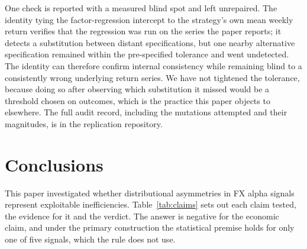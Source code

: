 \documentclass[11pt]{article}
\begin{document}
One check is reported with a measured blind spot and left unrepaired. The identity tying the factor-regression intercept to the strategy's own mean weekly return verifies that the regression was run on the series the paper reports; it detects a substitution between distant specifications, but one nearby alternative specification remained within the pre-specified tolerance and went undetected. The identity can therefore confirm internal consistency while remaining blind to a consistently wrong underlying return series. We have not tightened the tolerance, because doing so after observing which substitution it missed would be a threshold chosen on outcomes, which is the practice this paper objects to elsewhere. The full audit record, including the mutations attempted and their magnitudes, is in the replication repository.

\section{Conclusions}

This paper investigated whether distributional asymmetries in FX alpha signals represent exploitable inefficiencies. Table~\ref{tab:claims} sets out each claim tested, the evidence for it and the verdict. The answer is negative for the economic claim, and under the primary construction the statistical premise holds for only one of five signals, which the rule does not use.
\end{document}
